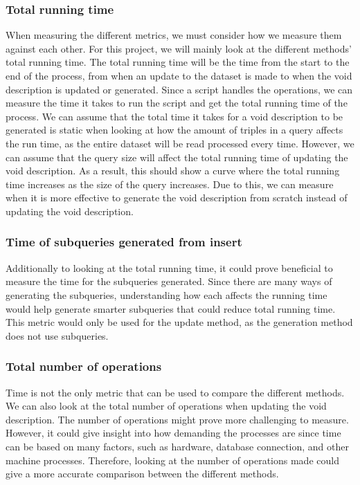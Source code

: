 \subsubsection{Total running time}
When measuring the different metrics, we must consider how we measure them against each other. For this project, we will mainly look at the different methods' total running time. The total running time will be the time from the start to the end of the process, from when an update to the dataset is made to when the \gls{void} description is updated or generated. Since a script handles the operations, we can measure the time it takes to run the script and get the total running time of the process.
We can assume that the total time it takes for a \gls{void} description to be generated is static when looking at how the amount of triples in a query affects the run time, as the entire dataset will be read processed every time. However, we can assume that the query size will affect the total running time of updating the \gls{void} description. As a result, this should show a curve where the total running time increases as the size of the query increases. Due to this, we can measure when it is more effective to generate the \gls{void} description from scratch instead of updating the \gls{void} description.

\subsubsection{Time of subqueries generated from insert}
Additionally to looking at the total running time, it could prove beneficial to measure the time for the subqueries generated. Since there are many ways of generating the subqueries, understanding how each affects the running time would help generate smarter subqueries that could reduce total running time. This metric would only be used for the update method, as the generation method does not use subqueries.

\subsubsection{Total number of operations}
Time is not the only metric that can be used to compare the different methods. We can also look at the total number of operations when updating the \gls{void} description. The number of operations might prove more challenging to measure. However, it could give insight into how demanding the processes are since time can be based on many factors, such as hardware, database connection, and other machine processes. Therefore, looking at the number of operations made could give a more accurate comparison between the different methods.